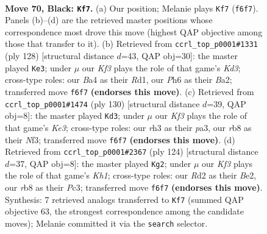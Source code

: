 \documentclass[11pt]{article}
\begin{document}
\clearpage

\begin{figure}[p]\centering
\begin{subfigure}{0.46\textwidth}\centering
\resizebox{\linewidth}{!}{%
\newchessgame
\chessboard[
  setfen={1R4n1/p7/P4k1p/1P3p2/b4P2/7R/3r4/4b1K1 b - - 10 70},
  showmover=false,
  pgfstyle=straightmove, color=movearrow, markmove={f6-f7}
]}
\caption{}
\end{subfigure}\hfill
\begin{subfigure}{0.46\textwidth}\centering
\resizebox{\linewidth}{!}{%
\newchessgame
\chessboard[
  setfen={4k3/7p/2r2BpP/6P1/1r6/3K4/B2p4/3R4 w - - 7 65},
  showmover=false,
  pgfstyle=straightmove, color=movearrow, markmove={d3-e3}
]}
\caption{}
\end{subfigure}
\\[4pt]
\begin{subfigure}{0.46\textwidth}\centering
\resizebox{\linewidth}{!}{%
\newchessgame
\chessboard[
  setfen={4k3/6p1/6r1/1p2P1Bp/1P6/p3KN2/P7/8 w - - 3 66},
  showmover=false,
  pgfstyle=straightmove, color=movearrow, markmove={e3-d3}
]}
\caption{}
\end{subfigure}\hfill
\begin{subfigure}{0.46\textwidth}\centering
\resizebox{\linewidth}{!}{%
\newchessgame
\chessboard[
  setfen={8/8/8/2rNp1k1/P3P3/2P3p1/4B2p/7K w - - 17 63},
  showmover=false,
  pgfstyle=straightmove, color=movearrow, markmove={h1-g2}
]}
\caption{}
\end{subfigure}
\caption{\textbf{Move 70, Black: \texttt{Kf7}.} (a) Our position; Melanie plays \texttt{Kf7} (\texttt{f6f7}). Panels (b)--(d) are the retrieved master positions whose correspondence most drove this move (highest QAP objective among those that transfer to it). (b) Retrieved from \texttt{ccrl\_top\_p0001\#1331} (ply 128) [structural distance $d$=43, QAP obj=30]: the master played \texttt{Ke3}; under $\mu$ our \emph{Kf3} plays the role of that game's \emph{Kd3}; cross-type roles: our \emph{B}a4 as their \emph{R}d1, our \emph{P}h6 as their \emph{B}a2; transferred move \texttt{f6f7} \textbf{(endorses this move)}. (c) Retrieved from \texttt{ccrl\_top\_p0001\#1474} (ply 130) [structural distance $d$=39, QAP obj=8]: the master played \texttt{Kd3}; under $\mu$ our \emph{Kf3} plays the role of that game's \emph{Ke3}; cross-type roles: our \emph{r}h3 as their \emph{p}a3, our \emph{r}b8 as their \emph{N}f3; transferred move \texttt{f6f7} \textbf{(endorses this move)}. (d) Retrieved from \texttt{ccrl\_top\_p0001\#2367} (ply 124) [structural distance $d$=37, QAP obj=8]: the master played \texttt{Kg2}; under $\mu$ our \emph{Kf3} plays the role of that game's \emph{Kh1}; cross-type roles: our \emph{R}d2 as their \emph{B}e2, our \emph{r}b8 as their \emph{P}c3; transferred move \texttt{f6f7} \textbf{(endorses this move)}. Synthesis: 7 retrieved analogs transferred to \texttt{Kf7} (summed QAP objective 63, the strongest correspondence among the candidate moves); Melanie committed it via the \texttt{search} selector.}
\label{fig:thought-m139}
\end{figure}
\end{document}
